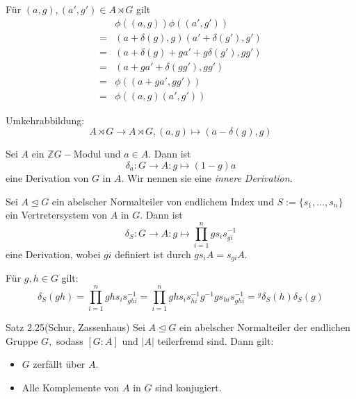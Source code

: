 \documentclass{beamer}
\begin{document}
\begin{frame}
Für $(a,g),(a',g')\in A\rtimes G$ gilt\pause
\begin{align*}
&\phi((a,g))\phi((a',g'))\\ 
=&(a+\delta(g),g)(a'+\delta(g'),g')\\
=&(a+\delta(g)+ga'+g\delta(g'),gg')\\
=&(a+ga' +\delta(gg'),gg')\\
=&\phi((a+ga',gg'))\\
=&\phi((a,g)(a',g'))
\end{align*}

\pause
Umkehrabbildung:
\[
A\rtimes G \to A\rtimes G,(a,g)\mapsto (a-\delta(g),g)
\]
\end{frame}
\begin{frame}
Sei $A$ ein $\mathbb{Z}G-$Modul und $a\in A.$ Dann ist 
\[
\delta_a:G\to A:g\mapsto (1-g)a
\]
eine Derivation von $G$ in $A.$ Wir nennen sie eine \emph{innere Derivation.}
\end{frame}
\begin{frame}
Sei $A\trianglelefteq G$ ein abelscher Normalteiler von endlichem Index und $S:=\{s_1,\ldots,s_n\}$ ein Vertretersystem von $A$ in $G.$ Dann ist 
\[
\delta_S:G\to A:g\mapsto \prod_{i=1}^ngs_is_{gi}^{-1}
\]
eine Derivation, wobei $gi$ definiert ist durch $gs_iA=s_{gi}A.$
\end{frame}
\begin{frame}
Für $g,h\in G$ gilt:
\[
\delta_S(gh)=\prod_{i=1}^nghs_is_{ghi}^{-1}=\prod_{i=1}^nghs_is_{hi}^{-1}g^{-1}gs_{hi}s_{ghi}^{-1}={}^g\delta_S(h)\delta_S(g)
\]
\end{frame}
\begin{frame}
\begin{block}{Satz 2.25(Schur, Zassenhaus)}
Sei $A\trianglelefteq G$ ein abelscher Normalteiler der endlichen Gruppe $G,$ sodass $[G:A]$ und $\vert A\vert$ teilerfremd sind. Dann gilt:
\begin{itemize}
\item $G$ zerfällt über $A.$
\item Alle Komplemente von $A$ in $G$ sind konjugiert.
\end{itemize}
\end{block}
\end{frame}
\end{document}
